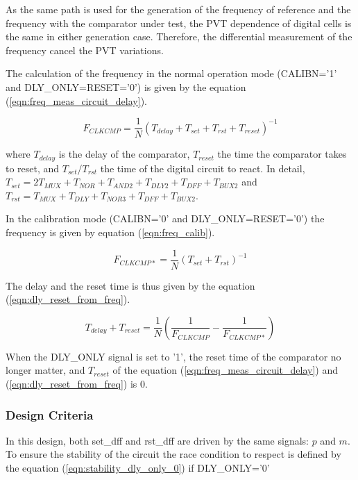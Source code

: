 As the same path is used for the generation of the frequency of reference and the frequency with the comparator under test, the PVT dependence of digital cells is the same in either generation case. Therefore, the differential measurement of the frequency cancel the PVT variations.

The calculation of the frequency in the normal operation mode (CALIBN='1' and DLY\_ONLY=RESET='0') is given by the equation (\ref{eqn:freq_meas_circuit_delay}).

\begin{equation} \label{eqn:freq_meas_circuit_delay}
F_{CLKCMP} = \frac{1}{N} {\left(T_{delay}+T_{set}+T_{rst}+T_{reset}\right)}^{-1}
\end{equation}

where $T_{delay}$ is the delay of the comparator, $T_{reset}$ the time the comparator takes to reset, and $T_{set}$/$T_{rst}$ the time of the digital circuit to react. In detail, $T_{set} = 2 T_{MUX} + T_{NOR} + T_{AND2} + T_{DLY2} + T_{DFF} + T_{BUX2}$ and $T_{rst} = T_{MUX} + T_{DLY} + T_{NOR3} + T_{DFF} + T_{BUX2}$.

In the calibration mode (CALIBN='0' and DLY\_ONLY=RESET='0') the frequency is given by equation (\ref{eqn:freq_calib}).

\begin{equation} \label{eqn:freq_calib}
F_{CLKCMP*} = \frac{1}{N} \left(T_{set}+T_{rst}\right)^{-1}
\end{equation}

The delay and the reset time is thus given by the equation (\ref{eqn:dly_reset_from_freq}).

\begin{equation}
\label{eqn:dly_reset_from_freq}
T_{delay}+T_{reset} = \frac{1}{N} \left( \frac{1}{F_{CLKCMP}} - \frac{1}{F_{CLKCMP*}} \right)
\end{equation}

When the DLY\_ONLY signal is set to '1', the reset time of the comparator no longer matter, and $T_{reset}$ of the equation (\ref{eqn:freq_meas_circuit_delay}) and (\ref{eqn:dly_reset_from_freq}) is 0.

\subsubsection{Design Criteria}
In this design, both set\_dff and rst\_dff are driven by the same signals: $p$ and $m$. To ensure the stability of the circuit the race condition to respect is defined by the equation (\ref{eqn:stability_dly_only_0}) if DLY\_ONLY='0' 

